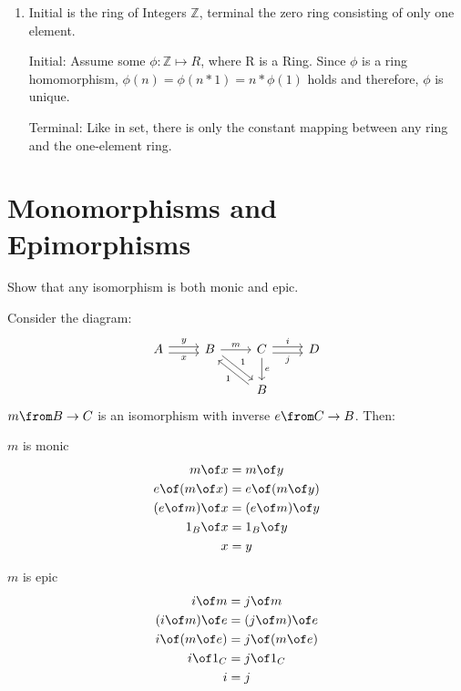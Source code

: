 \begin{answer}
\begin{enumerate}
  \item Initial is the ring of Integers $\mathbb{Z}$, terminal the zero ring consisting of only one element.

    Initial: Assume some $ \phi: \mathbb{Z} \mapsto R $, where R is a Ring. Since $\phi$ is a ring homomorphism, $\phi(n) = \phi(n*1) = n*\phi(1)$ holds and therefore, $\phi$ is unique.

    Terminal: Like in set, there is only the constant mapping between any ring and the one-element ring.
  \end{enumerate}
\end{answer}

\section{Monomorphisms and Epimorphisms}


\begin{exercise}
Show that any isomorphism is both monic and epic.
\end{exercise}

\begin{answer}
  Consider the diagram:
  \[
    \begin{tikzcd}
      A \arrow[r,shift left, "y"] \arrow[r,shift right,swap,"x"] &
      B \arrow[dr, shift left, "1"]  \arrow{r}{m}  &
      C \arrow{d}{e} \arrow[r,shift left, "i"] \arrow[r,shift right,swap,"j"] & D\\
     &  & B \arrow[ul, shift left, "1"]&
    \end{tikzcd}
  \]
  $m \from B \to C$ is an isomorphism with inverse $e \from C \to B$.
  Then:\\
  \begin{minipage}{.5\linewidth}
    \vspace{4mm}
    \centering $m$ is monic
    \[
      \begin{aligned}
        m \of x &= m \of y\\
        e \of (m \of x) &= e \of (m \of y)\\
        (e \of m) \of x &= (e \of m) \of y\\
        1_B \of x &= 1_B \of y\\
        x &= y
      \end{aligned}
    \]
  \end{minipage}%
  \begin{minipage}{.5\linewidth}
    \vspace{4mm}
    \centering $m$ is epic
    \[
      \begin{aligned}
        i \of m &= j \of m \\
        (i \of m) \of e &= (j \of m) \of e\\
        i \of (m \of e) &= j \of (m \of e)\\
        i \of 1_C &= j \of 1_C\\
        i &= j
      \end{aligned}
    \]

  \end{minipage}%
\end{answer}

